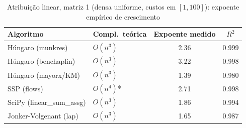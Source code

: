 \begin{table}[H]
    \centering
    \caption{Atribuição linear, matriz 1 (densa uniforme, custos em $[1, 100]$): expoente empírico de crescimento}
    \label{tab:exp-assignment}
    \renewcommand{\arraystretch}{1.25}
    \footnotesize
    \begin{tabularx}{\textwidth}{@{} X l c c @{}}
        \toprule
        \textbf{Algoritmo} & \textbf{Compl.\ teórica} & \textbf{Expoente medido} & \textbf{$R^2$} \\
        \midrule
        Húngaro (munkres) & $O(n^{3})$ & 2.36 & 0.999 \\
        Húngaro (benchaplin) & $O(n^{3})$ & 3.22 & 0.998 \\
        Húngaro (mayorx/KM) & $O(n^{3})$ & 1.39 & 0.980 \\
        SSP (flows) & $O(n^{4})$* & 2.71 & 0.998 \\
        SciPy (linear\_sum\_assg) & $O(n^{3})$ & 1.86 & 0.994 \\
        Jonker-Volgenant (lap) & $O(n^{3})$ & 1.65 & 0.987 \\
        \bottomrule
    \end{tabularx}
\end{table}
